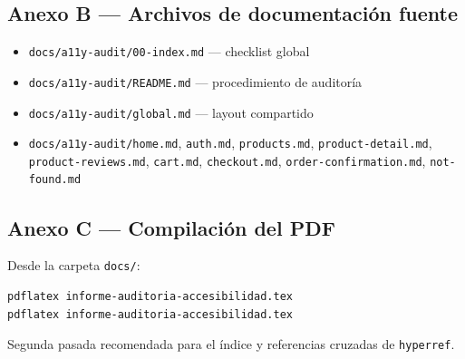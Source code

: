 \documentclass[11pt,a4paper]{article}
\begin{document}
\subsection{Anexo B --- Archivos de documentación fuente}

\begin{itemize}[noitemsep]
  \item \texttt{docs/a11y-audit/00-index.md} --- checklist global
  \item \texttt{docs/a11y-audit/README.md} --- procedimiento de auditoría
  \item \texttt{docs/a11y-audit/global.md} --- layout compartido
  \item \texttt{docs/a11y-audit/home.md}, \texttt{auth.md}, \texttt{products.md}, \texttt{product-detail.md}, \texttt{product-reviews.md}, \texttt{cart.md}, \texttt{checkout.md}, \texttt{order-confirmation.md}, \texttt{not-found.md}
\end{itemize}

\subsection{Anexo C --- Compilación del PDF}

Desde la carpeta \texttt{docs/}:

\begin{verbatim}
pdflatex informe-auditoria-accesibilidad.tex
pdflatex informe-auditoria-accesibilidad.tex
\end{verbatim}

Segunda pasada recomendada para el índice y referencias cruzadas de \texttt{hyperref}.
\end{document}
